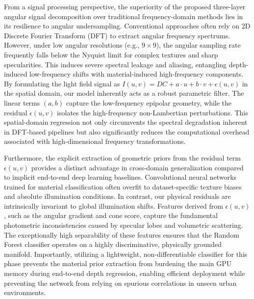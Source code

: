 From a signal processing perspective, the superiority of the proposed three-layer angular signal decomposition over traditional frequency-domain methods lies in its resilience to angular undersampling. Conventional approaches often rely on 2D Discrete Fourier Transform (DFT) to extract angular frequency spectrums. However, under low angular resolutions (e.g., $9 \times 9$), the angular sampling rate frequently falls below the Nyquist limit for complex textures and sharp specularities. This induces severe spectral leakage and aliasing, entangling depth-induced low-frequency shifts with material-induced high-frequency components. By formulating the light field signal as $I(u,v) = DC + a\cdot u + b\cdot v + \epsilon(u,v)$ in the spatial domain, our model inherently acts as a robust parametric filter. The linear terms $(a, b)$ capture the low-frequency epipolar geometry, while the residual $\epsilon(u,v)$ isolates the high-frequency non-Lambertian perturbations. This spatial-domain regression not only circumvents the spectral degradation inherent in DFT-based pipelines but also significantly reduces the computational overhead associated with high-dimensional frequency transformations.

Furthermore, the explicit extraction of geometric priors from the residual term $\epsilon(u,v)$ provides a distinct advantage in cross-domain generalization compared to implicit end-to-end deep learning baselines. Convolutional neural networks trained for material classification often overfit to dataset-specific texture biases and absolute illumination conditions. In contrast, our physical residuals are intrinsically invariant to global illumination shifts. Features derived from $\epsilon(u,v)$, such as the angular gradient and cone score, capture the fundamental photometric inconsistencies caused by specular lobes and volumetric scattering. The exceptionally high separability of these features ensures that the Random Forest classifier operates on a highly discriminative, physically grounded manifold. Importantly, utilizing a lightweight, non-differentiable classifier for this phase prevents the material prior extraction from burdening the main GPU memory during end-to-end depth regression, enabling efficient deployment while preventing the network from relying on spurious correlations in unseen urban environments.


